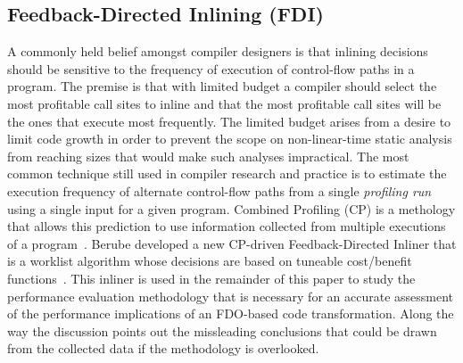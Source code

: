 \subsection{Feedback-Directed Inlining (FDI)}

A commonly held belief amongst compiler designers is that inlining decisions should be sensitive to the frequency of execution of control-flow paths in a program. The premise is that with limited budget a compiler should select the most profitable call sites to inline and that the most profitable call sites will be the ones that execute most frequently. The limited budget arises from a desire to limit code growth in order to prevent the scope on non-linear-time static analysis from reaching sizes that would make such analyses impractical. The most common technique still used in compiler research and practice is to estimate the execution frequency of alternate control-flow paths from a single {\em profiling run} using a single input for a given program. Combined Profiling (CP) is a methology that allows this prediction to use information collected from multiple executions of a program~\cite{BerubeISPASS12}. Berube developed a new CP-driven Feedback-Directed Inliner that is a worklist algorithm whose decisions are based on tuneable cost/benefit functions~\cite{BerubePhD}. This inliner is used in the remainder of this paper to study the performance evaluation methodology that is necessary for an accurate assessment of the performance implications of an FDO-based code transformation. Along the way the discussion points out the missleading conclusions that could be drawn from the collected data if the methodology is overlooked.
